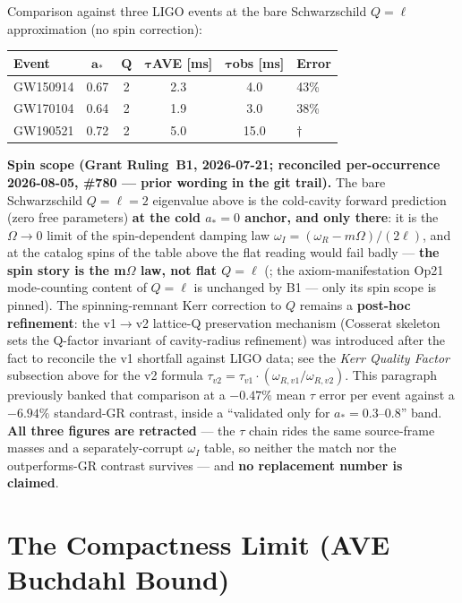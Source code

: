 \medskip\noindent
Comparison against three LIGO events at the bare Schwarzschild $Q = \ell$ approximation (no spin correction):

\begin{center}
\renewcommand{\arraystretch}{1.3}
\begin{tabularx}{\textwidth}{@{}l c c c c X@{}}
\toprule
\textbf{Event} & $\mathbf{a_*}$ & $\mathbf{Q}$ & $\boldsymbol{\tau}$\textbf{AVE [ms]} & $\boldsymbol{\tau}$\textbf{obs [ms]} & \textbf{Error} \\
\midrule
GW150914 & 0.67 & 2 & 2.3 & 4.0 & 43\% \\
GW170104 & 0.64 & 2 & 1.9 & 3.0 & 38\% \\
GW190521 & 0.72 & 2 & 5.0 & 15.0 & $\dagger$ \\
\bottomrule
\end{tabularx}
\end{center}
\noindent\textbf{Spin scope (Grant Ruling~B1, 2026-07-21; reconciled per-occurrence 2026-08-05, \#780 --- prior wording in the git trail).} The bare Schwarzschild $Q = \ell = 2$ eigenvalue above is the cold-cavity forward prediction (zero free parameters) \textbf{at the cold $a_* = 0$ anchor, and only there}: it is the $\Omega \to 0$ limit of the spin-dependent damping law $\omega_I = (\omega_R - m\Omega)/(2\ell)$, and at the catalog spins of the table above the flat reading would fail badly --- \textbf{the spin story is the m$\Omega$ law, not flat $Q = \ell$} (; the axiom-manifestation Op21 mode-counting content of $Q = \ell$ is unchanged by B1 --- only its spin scope is pinned). The spinning-remnant Kerr correction to $Q$ remains a \textbf{post-hoc refinement}: the v1$\to$v2 lattice-Q preservation mechanism (Cosserat skeleton sets the Q-factor invariant of cavity-radius refinement) was introduced after the fact to reconcile the v1 shortfall against LIGO data; see the \emph{Kerr Quality Factor} subsection above for the v2 formula $\tau_{v2} = \tau_{v1} \cdot (\omega_{R,v1}/\omega_{R,v2})$. This paragraph previously banked that comparison at a $-0.47\%$ mean $\tau$ error per event against a $-6.94\%$ standard-GR contrast, inside a ``validated only for $a_* = 0.3$--$0.8$'' band. \textbf{All three figures are retracted} --- the $\tau$ chain rides the same source-frame masses and a separately-corrupt $\omega_I$ table, so neither the match nor the outperforms-GR contrast survives --- and \textbf{no replacement number is claimed}.

\section{The Compactness Limit (AVE Buchdahl Bound)}
\label{sec:compactness_limit}

